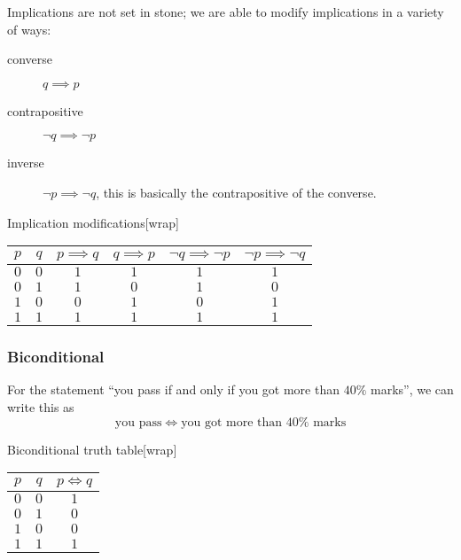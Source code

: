 Implications are not set in stone; we are able to modify implications in a variety of ways:
\begin{description}
    \item[converse] \(q\implies p\)
    \item[contrapositive] \(\neg q \implies \neg p\)
    \item[inverse] \(\neg p \implies \neg q\), this is basically the contrapositive of the converse.
\end{description}

\begin{highlight}{Implication modifications}[wrap]
    \centering
    \begin{tabular}{cccccc}
        \toprule
        \(p\) & \(q\) & \(p \implies q\) & \(q \implies p\) & \(\neg q \implies \neg p\) & \(\neg p \implies \neg q\) \\
        \midrule
        \(0\) & \(0\) & \(1\)            & \(1\)            & \(1\)                      & \(1\)                      \\
        \(0\) & \(1\) & \(1\)            & \(0\)            & \(1\)                      & \(0\)                      \\
        \(1\) & \(0\) & \(0\)            & \(1\)            & \(0\)                      & \(1\)                      \\
        \(1\) & \(1\) & \(1\)            & \(1\)            & \(1\)                      & \(1\)                      \\
        \bottomrule
    \end{tabular}
\end{highlight}

\subsubsection{Biconditional}\label{ssub:biconditional}

For the statement ``you pass if and only if you got more than \(40\%\) marks'', we can write this as
\[
    \text{you pass} \iff \text{you got more than \(40\%\) marks}
\]

\begin{highlight}{Biconditional truth table}[wrap]
    \begin{tabular}{ccc}
        \toprule
        \(p\) & \(q\) & \(p \iff q\) \\
        \midrule
        \(0\) & \(0\) & \(1\)        \\
        \(0\) & \(1\) & \(0\)        \\
        \(1\) & \(0\) & \(0\)        \\
        \(1\) & \(1\) & \(1\)        \\
        \bottomrule
    \end{tabular}
\end{highlight}

